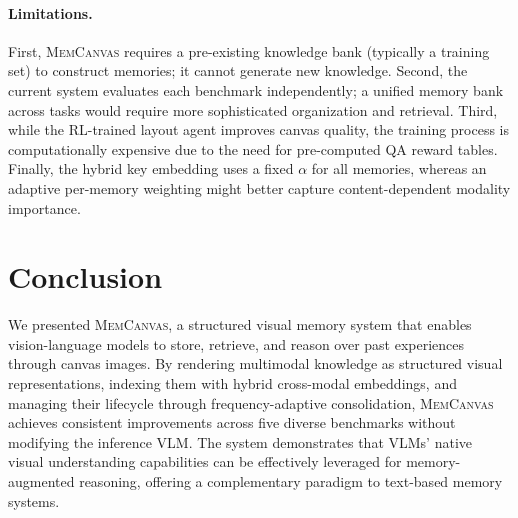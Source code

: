 \documentclass{article}
\newcommand{\memcanvas}{\textsc{MemCanvas}}
\begin{document}
\paragraph{Limitations.}
First, \memcanvas{} requires a pre-existing knowledge bank (typically a training set) to construct memories; it cannot generate new knowledge. Second, the current system evaluates each benchmark independently; a unified memory bank across tasks would require more sophisticated organization and retrieval. Third, while the RL-trained layout agent improves canvas quality, the training process is computationally expensive due to the need for pre-computed QA reward tables. Finally, the hybrid key embedding uses a fixed $\alpha$ for all memories, whereas an adaptive per-memory weighting might better capture content-dependent modality importance.

\section{Conclusion}
\label{sec:conclusion}

We presented \memcanvas{}, a structured visual memory system that enables vision-language models to store, retrieve, and reason over past experiences through canvas images. By rendering multimodal knowledge as structured visual representations, indexing them with hybrid cross-modal embeddings, and managing their lifecycle through frequency-adaptive consolidation, \memcanvas{} achieves consistent improvements across five diverse benchmarks without modifying the inference VLM. The system demonstrates that VLMs' native visual understanding capabilities can be effectively leveraged for memory-augmented reasoning, offering a complementary paradigm to text-based memory systems.




\newpage

\end{document}
